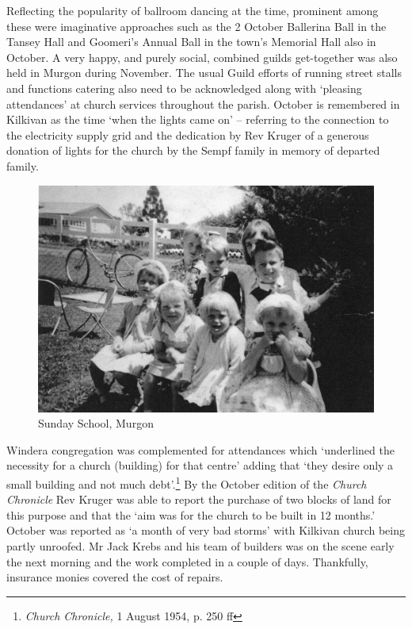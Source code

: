 Reflecting the popularity of ballroom dancing at the time, prominent among these were imaginative approaches such as the 2 October Ballerina Ball in the Tansey Hall and Goomeri's Annual Ball in the town's Memorial Hall also in October. A very happy, and purely social, combined guilds get-together was also held in Murgon during November. The usual Guild efforts of running street stalls and functions catering also need to be acknowledged along with `pleasing attendances' at church services throughout the parish. October is remembered in Kilkivan as the time `when the lights came on' -- referring to the connection to the electricity supply grid and the dedication by Rev Kruger of a generous donation of lights for the church by the Sempf family in memory of departed family.









\begin{figure}
\begin{center}
\includegraphics[width=1.\linewidth,center]{../images/sundaySchoolMurgon.jpg}
\caption{Sunday School, Murgon}
\end{center}
\end{figure}




Windera congregation was complemented for attendances which `underlined the necessity for a church (building) for that centre' adding that `they desire only a small building and not much debt'.\footnote{\emph{Church Chronicle,} 1 August 1954, p. 250 ff} By the October edition of the \emph{Church Chronicle} Rev Kruger was able to report the purchase of two blocks of land for this purpose and that the `aim was for the church to be built in 12 months.' October was reported as `a month of very bad storms' with Kilkivan church being partly unroofed. Mr Jack Krebs and his team of builders was on the scene early the next morning and the work completed in a couple of days. Thankfully, insurance monies covered the cost of repairs.


